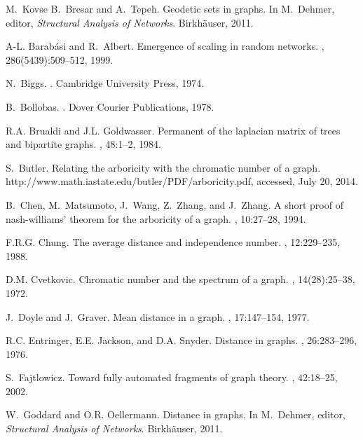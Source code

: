 \documentclass[12pt]{amsart}
\theoremstyle{definition}
\begin{document}
\begin{thebibliography}{10}

M.~Kovse B.~Bresar and A.~Tepeh.
\newblock Geodetic sets in graphs.
\newblock In M.~Dehmer, editor, {\em Structural Analysis of Networks}.
  Birkh{\"a}user, 2011.

A-L. Barab{\'a}si and R.~Albert.
\newblock Emergence of scaling in random networks.
, 286(5439):509--512, 1999.

N.~Biggs.
.
\newblock Cambridge University Press, 1974.

B.~Bollobas.
.
\newblock Dover Courier Publications, 1978.

R.A. Brualdi and J.L. Goldwasser.
\newblock Permanent of the laplacian matrix of trees and bipartite graphs.
, 48:1--2, 1984.

S.~Butler.
\newblock Relating the arboricity with the chromatic number of a graph.
\newblock http://www.math.iastate.edu/butler/PDF/arboricity.pdf, accessed, July
  20, 2014.

B.~Chen, M.~Matsumoto, J.~Wang, Z.~Zhang, and J.~Zhang.
\newblock A short proof of nash-williams' theorem for the arboricity of a
  graph.
, 10:27--28, 1994.

F.R.G. Chung.
\newblock The average distance and independence number.
, 12:229--235, 1988.

D.M. Cvetkovic.
\newblock Chromatic number and the spectrum of a graph.
, 14(28):25--38, 1972.

J.~Doyle and J.~Graver.
\newblock Mean distance in a graph.
, 17:147--154, 1977.

R.C. Entringer, E.E. Jackson, and D.A. Snyder.
\newblock Distance in graphs.
, 26:283--296, 1976.

S.~Fajtlowicz.
\newblock Toward fully automated fragments of graph theory.
, 42:18--25, 2002.

W.~Goddard and O.R. Oellermann.
\newblock Distance in graphs.
\newblock In M.~Dehmer, editor, {\em Structural Analysis of Networks}.
  Birkh{\"a}user, 2011.


\end{thebibliography}
\end{document}
